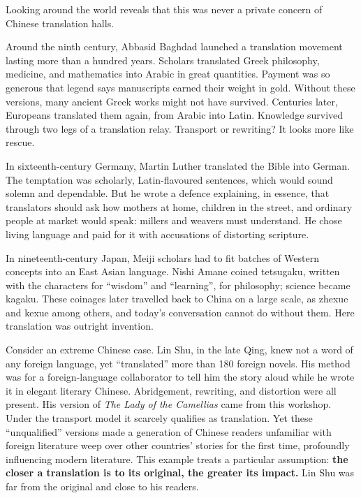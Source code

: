 Looking around the world reveals that this was never a private concern of Chinese translation halls.

Around the ninth century, Abbasid Baghdad launched a translation movement lasting more than a hundred years. Scholars translated Greek philosophy, medicine, and mathematics into Arabic in great quantities. Payment was so generous that legend says manuscripts earned their weight in gold. Without these versions, many ancient Greek works might not have survived. Centuries later, Europeans translated them again, from Arabic into Latin. Knowledge survived through two legs of a translation relay. Transport or rewriting? It looks more like rescue.

In sixteenth-century Germany, Martin Luther translated the Bible into German. The temptation was scholarly, Latin-flavoured sentences, which would sound solemn and dependable. But he wrote a defence explaining, in essence, that translators should ask how mothers at home, children in the street, and ordinary people at market would speak: millers and weavers must understand. He chose living language and paid for it with accusations of distorting scripture.

In nineteenth-century Japan, Meiji scholars had to fit batches of Western concepts into an East Asian language. Nishi Amane coined tetsugaku, written with the characters for ``wisdom'' and ``learning'', for philosophy; science became kagaku. These coinages later travelled back to China on a large scale, as zhexue and kexue among others, and today's conversation cannot do without them. Here translation was outright invention.

Consider an extreme Chinese case. Lin Shu, in the late Qing, knew not a word of any foreign language, yet ``translated'' more than 180 foreign novels. His method was for a foreign-language collaborator to tell him the story aloud while he wrote it in elegant literary Chinese. Abridgement, rewriting, and distortion were all present. His version of \emph{The Lady of the Camellias} came from this workshop. Under the transport model it scarcely qualifies as translation. Yet these ``unqualified'' versions made a generation of Chinese readers unfamiliar with foreign literature weep over other countries' stories for the first time, profoundly influencing modern literature. This example treats a particular assumption: \textbf{the closer a translation is to its original, the greater its impact.} Lin Shu was far from the original and close to his readers.

